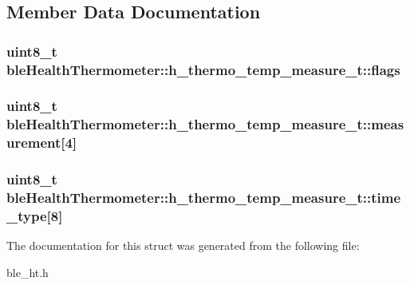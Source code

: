 \subsection{Member Data Documentation}
\hypertarget{structble_health_thermometer_1_1h__thermo__temp__measure__t_ad2beee2a9d16609e0171df720eea4fc4}{
\subsubsection[{flags}]{\setlength{\rightskip}{0pt plus 5cm}uint8\-\_\-t ble\-Health\-Thermometer\-::h\-\_\-thermo\-\_\-temp\-\_\-measure\-\_\-t\-::flags}}\label{structble_health_thermometer_1_1h__thermo__temp__measure__t_ad2beee2a9d16609e0171df720eea4fc4}
\hypertarget{structble_health_thermometer_1_1h__thermo__temp__measure__t_ae65911e1474d1271d982d70b2624609f}{
\subsubsection[{measurement}]{\setlength{\rightskip}{0pt plus 5cm}uint8\-\_\-t ble\-Health\-Thermometer\-::h\-\_\-thermo\-\_\-temp\-\_\-measure\-\_\-t\-::measurement\mbox{[}4\mbox{]}}}\label{structble_health_thermometer_1_1h__thermo__temp__measure__t_ae65911e1474d1271d982d70b2624609f}
\hypertarget{structble_health_thermometer_1_1h__thermo__temp__measure__t_a5827f7c41051575943c0b7c85a20ef72}{
\subsubsection[{time\-\_\-type}]{\setlength{\rightskip}{0pt plus 5cm}uint8\-\_\-t ble\-Health\-Thermometer\-::h\-\_\-thermo\-\_\-temp\-\_\-measure\-\_\-t\-::time\-\_\-type\mbox{[}8\mbox{]}}}\label{structble_health_thermometer_1_1h__thermo__temp__measure__t_a5827f7c41051575943c0b7c85a20ef72}


The documentation for this struct was generated from the following file\-:\begin{DoxyCompactItemize}
\item 
ble\-\_\-ht.\-h\end{DoxyCompactItemize}
